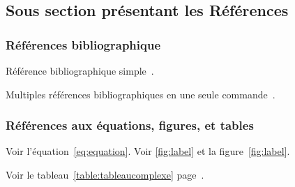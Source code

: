 \subsection{Sous section présentant les Références}

\subsubsection{Références bibliographique}

Référence bibliographique simple~\cite{Amendola2017}.

Multiples références bibliographiques en une seule commande~\cite{Petkov2005,Raman2009,Colinet2004}.


\subsubsection{Références aux équations, figures, et tables}

Voir l'équation~\eqref{eq:equation}. Voir \autoref{fig:label} et la figure~\ref{fig:label}.

Voir le tableau~\ref{table:tableaucomplexe} page~\pageref{table:tableaucomplexe}.

